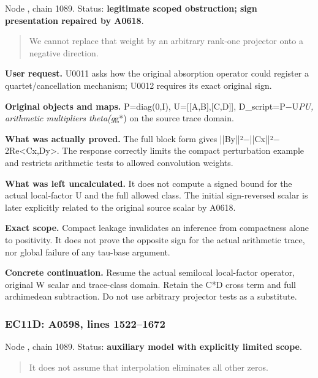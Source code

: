 Node \protect{}, chain 1089.
Status: \textbf{legitimate scoped obstruction; sign presentation
repaired by A0618}.

\begin{quote}
We cannot replace that weight by an arbitrary rank-one projector onto a
negative direction.
\end{quote}

\textbf{User request.} U0011 asks how the original absorption operator
could register a quartet/cancellation mechanism; U0012 requires its
exact original sign.

\textbf{Original objects and maps.} P=diag(0,I),
U={[}{[}A,B{]},{[}C,D{]}{]},
D\_script=P\allowbreak{}\ensuremath{−}\allowbreak{}U\emph{PU, arithmetic
multipliers theta(g}g*) on the source trace domain.

\textbf{What was actually proved.} The full block form gives
||By||²\allowbreak{}\ensuremath{−}\allowbreak{}||Cx||²\allowbreak{}\ensuremath{−}\allowbreak{}2Re<Cx,Dy>.
The response correctly limits the compact perturbation example and
restricts arithmetic tests to allowed convolution weights.

\textbf{What was left uncalculated.} It does not compute a signed bound
for the actual local-factor U and the full allowed class. The initial
sign-reversed scalar is later explicitly related to the original source
scalar by A0618.

\textbf{Exact scope.} Compact leakage invalidates an inference from
compactness alone to positivity. It does not prove the opposite sign for
the actual arithmetic trace, nor global failure of any tau-base
argument.

\textbf{Concrete continuation.} Resume the actual semilocal local-factor
operator, original W scalar and trace-class domain. Retain the C*D cross
term and full archimedean subtraction. Do not use arbitrary projector
tests as a substitute.

\subsubsection{EC11D: A0598, lines
1522--1672}\label{TranscriptLedgerStage:ec11d-a0598-lines-15221672}

Node \protect{}, chain 1089.
Status: \textbf{auxiliary model with explicitly limited scope}.

\begin{quote}
It does not assume that interpolation eliminates all other zeros.
\end{quote}

